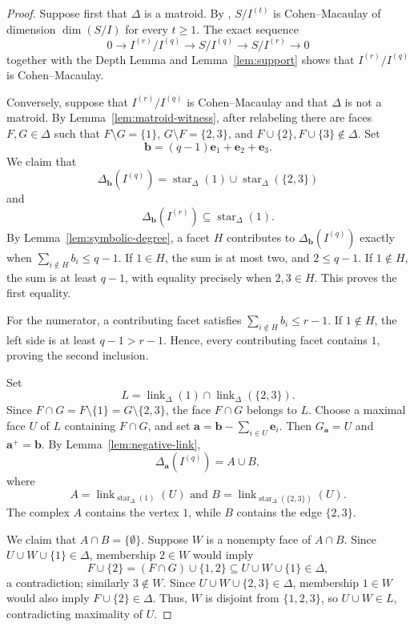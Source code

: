 \documentclass[12pt]{amsart}
\theoremstyle{plain}
\theoremstyle{definition}
\theoremstyle{remark}
\begin{document}
\begin{proof}
Suppose first that $\Delta$ is a matroid. By \cite{MinhTrung,Varbaro},
$S/I^{(t)}$ is Cohen--Macaulay of dimension $\dim(S/I)$ for every $t\ge1$.
The exact sequence
$$
0\longrightarrow I^{(r)}/I^{(q)}
\longrightarrow S/I^{(q)}
\longrightarrow S/I^{(r)}\longrightarrow0
$$
together with the Depth Lemma and Lemma~\ref{lem:support} shows that
$I^{(r)}/I^{(q)}$ is Cohen--Macaulay.

Conversely, suppose that $I^{(r)}/I^{(q)}$ is Cohen--Macaulay and that
$\Delta$ is not a matroid. By Lemma~\ref{lem:matroid-witness}, after
relabeling there are faces $F,G\in\Delta$ such that
$F\setminus G=\{1\}$, $G\setminus F=\{2,3\}$, and
$F\cup\{2\},F\cup\{3\}\notin\Delta$. Set
$$
\mathbf b=(q-1)\mathbf e_1+\mathbf e_2+\mathbf e_3.
$$
We claim that
$$
\Delta_{\mathbf b}(I^{(q)})
=
\operatorname{star}_\Delta(1)
\cup
\operatorname{star}_\Delta(\{2,3\})
$$
and
$$
\Delta_{\mathbf b}(I^{(r)})
\subseteq
\operatorname{star}_\Delta(1).
$$
By Lemma~\ref{lem:symbolic-degree}, a facet $H$ contributes to
$\Delta_{\mathbf b}(I^{(q)})$ exactly when
$\sum_{i\notin H}b_i\le q-1$. If $1\in H$, the sum is at most two, and
$2\le q-1$. If $1\notin H$, the sum is at least $q-1$, with equality
precisely when $2,3\in H$. This proves the first equality.

For the numerator, a contributing facet satisfies
$\sum_{i\notin H}b_i\le r-1$. If $1\notin H$, the left side is at least
$q-1>r-1$. Hence, every contributing facet contains $1$, proving the second
inclusion.

Set
$$
L=\operatorname{link}_\Delta(1)
\cap
\operatorname{link}_\Delta(\{2,3\}).
$$
Since $F\cap G=F\setminus\{1\}=G\setminus\{2,3\}$, the face
$F\cap G$ belongs to $L$. Choose a maximal face $U$ of $L$ containing
$F\cap G$, and set
$\mathbf a=\mathbf b-\sum_{i\in U}\mathbf e_i$. Then
$G_{\mathbf a}=U$ and $\mathbf a^+=\mathbf b$. By
Lemma~\ref{lem:negative-link},
$$
\Delta_{\mathbf a}(I^{(q)})=A\cup B,
$$
where
$$
A=\operatorname{link}_{\operatorname{star}_\Delta(1)}(U)
\text{ and }
B=\operatorname{link}_{\operatorname{star}_\Delta(\{2,3\})}(U).
$$
The complex $A$ contains the vertex $1$, while $B$ contains the edge
$\{2,3\}$.

We claim that $A\cap B=\{\emptyset\}$. Suppose $W$ is a nonempty face of
$A\cap B$. Since $U\cup W\cup\{1\}\in\Delta$, membership $2\in W$
would imply
$$
F\cup\{2\}=(F\cap G)\cup\{1,2\}
\subseteq U\cup W\cup\{1\}\in\Delta,
$$
a contradiction; similarly $3\notin W$. Since
$U\cup W\cup\{2,3\}\in\Delta$, membership $1\in W$ would also
imply $F\cup\{2\}\in\Delta$. Thus, $W$ is disjoint from
$\{1,2,3\}$, so $U\cup W\in L$, contradicting maximality of $U$.


\end{proof}
\end{document}

